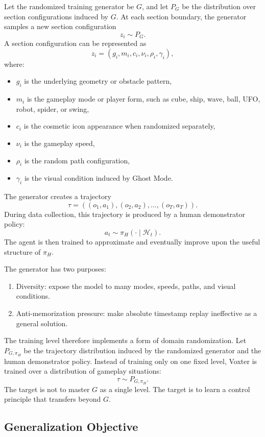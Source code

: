 \documentclass[11pt]{article}
\begin{document}
Let the randomized training generator be \(G\), and let \(P_G\) be the distribution over section configurations induced by \(G\). At each section boundary, the generator samples a new section configuration
\[
  z_i \sim P_G.
\]
A section configuration can be represented as
\[
  z_i = (g_i,m_i,c_i,\nu_i,\rho_i,\gamma_i),
\]
where:
\begin{itemize}
  \item \(g_i\) is the underlying geometry or obstacle pattern,
  \item \(m_i\) is the gameplay mode or player form, such as cube, ship, wave, ball, UFO, robot, spider, or swing,
  \item \(c_i\) is the cosmetic icon appearance when randomized separately,
  \item \(\nu_i\) is the gameplay speed,
  \item \(\rho_i\) is the random path configuration,
  \item \(\gamma_i\) is the visual condition induced by Ghost Mode.
\end{itemize}

The generator creates a trajectory
\[
  \tau = ((o_1,a_1),(o_2,a_2),\ldots,(o_T,a_T)).
\]
During data collection, this trajectory is produced by a human demonstrator policy:
\[
  a_t \sim \pi_H(\cdot \mid \mathcal{H}_t).
\]
The agent is then trained to approximate and eventually improve upon the useful structure of \(\pi_H\).

The generator has two purposes:
\begin{enumerate}
  \item Diversity: expose the model to many modes, speeds, paths, and visual conditions.
  \item Anti-memorization pressure: make absolute timestamp replay ineffective as a general solution.
\end{enumerate}

The training level therefore implements a form of domain randomization. Let \(P_{G,\pi_H}\) be the trajectory distribution induced by the randomized generator and the human demonstrator policy. Instead of training only on one fixed level, Voxter is trained over a distribution of gameplay situations:
\[
  \tau \sim P_{G,\pi_H}.
\]
The target is not to master \(G\) as a single level. The target is to learn a control principle that transfers beyond \(G\).

\subsection{Generalization Objective}
\end{document}
